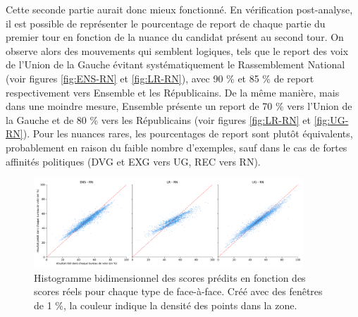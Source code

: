 \documentclass[11pt]{article}
\begin{document}
            Cette seconde partie aurait donc mieux fonctionné. En vérification post-analyse, il est possible de représenter le pourcentage de report de chaque partie du premier tour en fonction de la nuance du candidat présent au second tour. On observe alors des mouvements qui semblent logiques, tels que le report des voix de l'Union de la Gauche évitant systématiquement le Rassemblement National (voir figures \ref{fig:ENS-RN} et \ref{fig:LR-RN}), avec 90 \% et 85 \% de report respectivement vers Ensemble et les Républicains. De la même manière, mais dans une moindre mesure, Ensemble présente un report de 70 \% vers l'Union de la Gauche et de 80 \% vers les Républicains (voir figures \ref{fig:LR-RN} et \ref{fig:UG-RN}). Pour les nuances rares, les pourcentages de report sont plutôt équivalents, probablement en raison du faible nombre d'exemples, sauf dans le cas de fortes affinités politiques (DVG et EXG vers UG, REC vers RN).

            \begin{figure}
                \begin{center}
                    \includegraphics[width=0.9\textwidth]{Focus_True_Pred_Hist.pdf}
                    \caption{Histogramme bidimensionnel des scores prédits en fonction des scores réels pour chaque type de face-à-face. Créé avec des fenêtres de 1 \%, la couleur indique la densité des points dans la zone.}
                    \label{fig:Focus_pred_true}
                \end{center}
            \end{figure}
            
\end{document}
